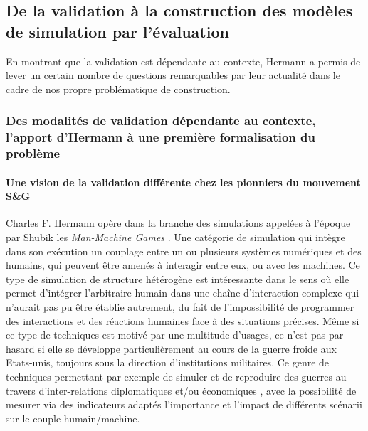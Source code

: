 
\subsection{De la validation à la construction des modèles de simulation par l'évaluation}
\label{ssec:evaluation_construction}


En montrant que la validation est dépendante au contexte, Hermann a permis de lever un certain nombre de questions remarquables par leur actualité dans le cadre de nos propre problématique de construction.  %

\subsubsection{Des modalités de validation dépendante au contexte, l'apport d'Hermann à une première formalisation du problème}
\label{sssec:hermann_contexte}

\paragraph{Une vision de la validation différente chez les pionniers du mouvement S\&G}

Charles F. Hermann opère dans la branche des simulations appelées à l'époque par Shubik les \textit{Man-Machine Games} \autocite{Shubik1972}. Une catégorie de simulation qui intègre dans son exécution un couplage entre un ou plusieurs systèmes numériques et des humains, qui peuvent être amenés à interagir entre eux, ou avec les machines. Ce type de simulation de structure hétérogène est intéressante dans le sens où elle permet d'intégrer l'arbitraire humain dans une chaîne d'interaction complexe qui n'aurait pas pu être établie autrement, du fait de l'impossibilité de programmer des interactions et des réactions humaines face à des situations précises. Même si ce type de techniques est motivé par une multitude d'usages, ce n'est pas par hasard si elle se développe particulièrement au cours de la guerre froide aux Etats-unis, toujours sous la direction d'institutions militaires. Ce genre de techniques permettant par exemple de simuler et de reproduire des guerres au travers d'inter-relations diplomatiques et/ou économiques \autocite{Hermann1967b}, avec la possibilité de mesurer via des indicateurs adaptés l'importance et l'impact de différents scénarii sur le couple humain/machine.

